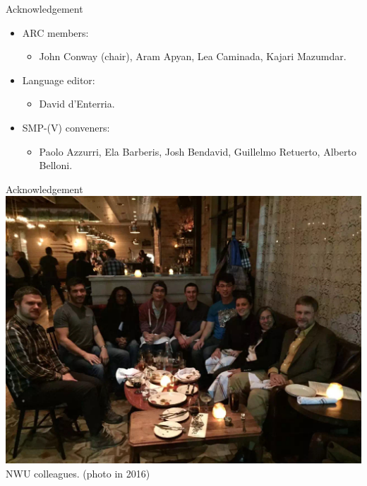 \begin{frame}{Acknowledgement}
    
    \begin{itemize}
        \item ARC members: 
        \begin{itemize}
        \smaller 
            \item John Conway (chair), Aram Apyan, Lea Caminada, Kajari Mazumdar.
        \end{itemize}
        
        \item Language editor: 
        \begin{itemize}
        \smaller 
            \item David d'Enterria.
        \end{itemize}
        
        \item SMP-(V) conveners:
        \begin{itemize}
        \smaller 
            \item Paolo Azzurri, Ela Barberis, Josh Bendavid, Guillelmo Retuerto, Alberto Belloni.
        \end{itemize}
    \end{itemize}
\end{frame}


\begin{frame}{Acknowledgement}
    \centering
    \includegraphics[height=0.7\textheight]{slides/figures/nuhep.JPG} \\
    NWU colleagues. (photo in 2016)
\end{frame}



